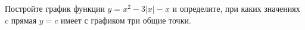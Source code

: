 \begin{ex}
	Постройте график функции $y=x^2-3|x|-x$ и определите, при каких значениях $c$ прямая $y=c$ имеет с графиком три общие точки.
\end{ex}